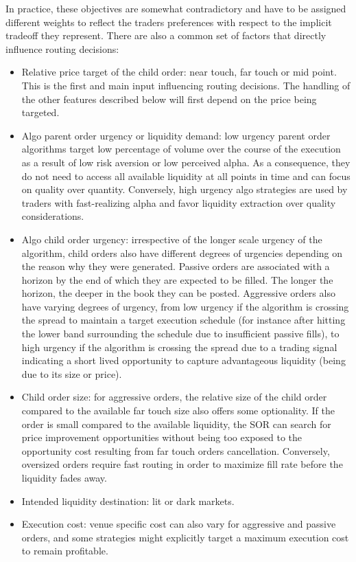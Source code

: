 In practice, these objectives are somewhat contradictory and have to be assigned different weights to reflect the traders preferences with respect to the implicit tradeoff they represent. There are also a common set of factors that directly influence routing decisions:


\begin{itemize}
\item Relative price target of the child order: near touch, far touch or mid point. This is the first and main input influencing routing decisions. The handling of the other features described below will first depend on the price being targeted.

\item Algo parent order urgency or liquidity demand: low urgency parent order algorithms target low percentage of volume over the course of the execution as a result of low risk aversion or low perceived alpha. As a consequence, they do not need to access all available liquidity at all points in time and can focus on quality over quantity. Conversely, high urgency algo strategies are used by traders with fast-realizing alpha and favor liquidity extraction over quality considerations.

\item Algo child order urgency: irrespective of the longer scale urgency of the algorithm, child orders also have different degrees of urgencies depending on the reason why they were generated. Passive orders are associated with a horizon by the end of which they are expected to be filled. The longer the horizon, the deeper in the book they can be posted. Aggressive orders also have varying degrees of urgency, from low urgency if the algorithm is crossing the spread to maintain a target execution schedule (for instance after hitting the lower band surrounding the schedule due to insufficient passive fills), to high urgency if the algorithm is crossing the spread due to a trading signal indicating a short lived opportunity to capture advantageous liquidity (being due to its size or price).

\item Child order size: for aggressive orders, the relative size of the child order compared to the available far touch size also offers some optionality. If the order is small compared to the available liquidity, the SOR can search for price improvement opportunities without being too exposed to the opportunity cost resulting from far touch orders cancellation. Conversely, oversized orders require fast routing in order to maximize fill rate before the liquidity fades away.

\item Intended liquidity destination: lit or dark markets.

\item Execution cost: venue specific cost can also vary for aggressive and passive orders, and some strategies might explicitly target a maximum execution cost to remain profitable. \twomedskip
\end{itemize}


